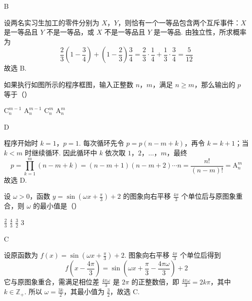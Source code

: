 \begin{answer}
B
\end{answer}

\begin{solution}
设两名实习生加工的零件分别为 \(X\)，\(Y\)，则恰有一个一等品包含两个互斥事件：\(X\) 是一等品且 \(Y\) 不是一等品，或 \(X\) 不是一等品且 \(Y\) 是一等品. 由独立性，所求概率为
\[
\frac{2}{3}\left(1-\frac{3}{4}\right)+\left(1-\frac{2}{3}\right)\frac{3}{4}=\frac{2}{3}\cdot\frac{1}{4}+\frac{1}{3}\cdot\frac{3}{4}=\frac{5}{12}
\]
故选 B.
\end{solution}

\begin{problem}
如果执行如图所示的程序框图，输入正整数 \(n\)，\(m\)，满足 \(n \geqslant m\)，那么输出的 \(p\) 等于（\quad）

\FloatBarrier

\choices
    {\(\mathrm C_n^{m-1}\)}
    {\(\mathrm A_n^{m-1}\)}
    {\(\mathrm C_n^m\)}
    {\(\mathrm A_n^m\)}
\end{problem}

\begin{answer}
D
\end{answer}

\begin{solution}
程序开始时 \(k=1\)，\(p=1\). 每次循环先令 \(p=p(n-m+k)\)，再令 \(k=k+1\)；当 \(k<m\) 时继续循环. 因此循环中 \(k\) 依次取 \(1\)，\(2\)，\(\ldots\)，\(m\)，最终
\[
p=\prod_{k=1}^{m}(n-m+k)=(n-m+1)(n-m+2)\cdots n=\frac{n!}{(n-m)!}=\mathrm A_n^m
\]
故选 D.
\end{solution}

\begin{problem}
设 \(\omega > 0\)，函数 \(y = \sin \left(\omega x + \frac{\pi}{3}\right) + 2\) 的图象向右平移 \(\frac{4\pi}{3}\) 个单位后与原图象重合，则 \(\omega\) 的最小值是（\quad）

\choices
    {\(\frac{2}{3}\)}
    {\( \frac{4}{3} \)}
    {\( \frac{3}{2} \)}
    {\(3\)}
\end{problem}

\begin{answer}
C
\end{answer}

\begin{solution}
设原函数为 \(f(x)=\sin\left(\omega x+\frac{\pi}{3}\right)+2\). 图象向右平移 \(\frac{4\pi}{3}\) 个单位后得到
\[
f\left(x-\frac{4\pi}{3}\right)=\sin\left(\omega x+\frac{\pi}{3}-\frac{4\pi\omega}{3}\right)+2
\]
它与原图象重合，需满足相位差 \(\frac{4\pi\omega}{3}\) 是 \(2\pi\) 的正整数倍，即 \(\frac{4\pi\omega}{3}=2k\pi\)，其中 \(k\in\mathbb Z_{+}\).
所以 \(\omega=\frac{3k}{2}\)，其最小值为 \(\frac{3}{2}\)，故选 C.
\end{solution}

